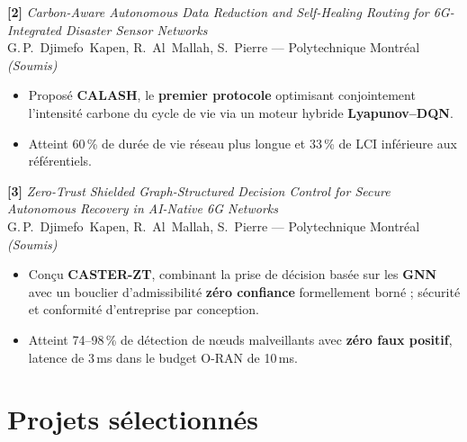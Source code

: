 \documentclass[10pt,a4paper,sans]{moderncv}
\begin{document}
\vspace{0.4em}
\textbf{[2]} \textit{Carbon-Aware Autonomous Data Reduction and Self-Healing
Routing for 6G-Integrated Disaster Sensor Networks}\\
G.\,P.~Djimefo~Kapen, R.~Al~Mallah, S.~Pierre --- Polytechnique
Montréal \hfill \textit{(Soumis)}
\begin{itemize}[leftmargin=1.5em, topsep=2pt, itemsep=0pt, parsep=0pt]
  \item Proposé \textbf{CALASH}, le \textbf{premier protocole} optimisant
        conjointement l'intensité carbone du cycle de vie via un moteur
        hybride \textbf{Lyapunov--DQN}.
  \item Atteint 60\,\% de durée de vie réseau plus longue et 33\,\% de LCI
        inférieure aux référentiels.
\end{itemize}

\vspace{0.4em}
\textbf{[3]} \textit{Zero-Trust Shielded Graph-Structured Decision Control for
Secure Autonomous Recovery in AI-Native 6G Networks}\\
G.\,P.~Djimefo~Kapen, R.~Al~Mallah, S.~Pierre --- Polytechnique
Montréal \hfill \textit{(Soumis)}
\begin{itemize}[leftmargin=1.5em, topsep=2pt, itemsep=0pt, parsep=0pt]
  \item Conçu \textbf{CASTER-ZT}, combinant la prise de décision basée sur
        les \textbf{GNN} avec un bouclier d'admissibilité \textbf{zéro
        confiance} formellement borné ; sécurité et conformité d'entreprise
        par conception.
  \item Atteint 74--98\,\% de détection de nœuds malveillants avec
        \textbf{zéro faux positif}, latence de 3\,ms dans le budget
        O-RAN de 10\,ms.
\end{itemize}

\section{Projets sélectionnés}

\end{document}
